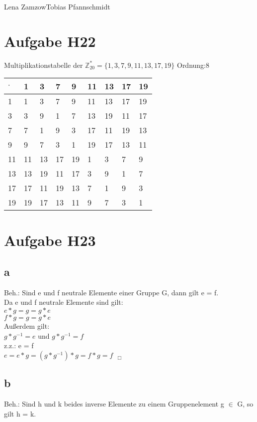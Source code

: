 \documentclass[11pt,a4paper]{article}
\begin{document}
                {Lena Zamzow}{Tobias Pfannschmidt}{}{}{}


\section*{Aufgabe H22}
Multiplikationstabelle der $\mathbb{Z}^{*}_{20} = \{1,3,7,9,11,13,17,19\}$ Ordnung:8\\
\begin{center}
	\begin{tabular}{ | l | l | l | l | l | l | l| l|l}
		\hline
		$\cdot$&1&3&7&9&11&13&17&19 \\ \hline \hline		
		1&1&3&7&9&11&13&17&19 \\ \hline 	
		3&3&9&1&7&13&19&11&17 \\ \hline
		7&7&1&9&3&17&11&19&13\\ \hline	
		9&9&7&3&1&19&17&13&11 \\ \hline
		11&11&13&17&19&1&3&7&9 \\ \hline
		13&13&19&11&17&3&9&1&7 \\ \hline
		17&17&11&19&13&7&1&9&3 \\ \hline
		19&19&17&13&11&9&7&3&1 \\ \hline 
	\end{tabular}
\end{center}
\section*{Aufgabe H23}
\subsection*{a}
Beh.: Sind e und f neutrale Elemente einer Gruppe G, dann gilt e = f. \\

Da e und f neutrale Elemente sind gilt: \\
$e \ast g = g = g \ast e$ \\
$f \ast g = g = g \ast e$ \\
Außerdem gilt: \\
$g \ast g^{-1} = e$ und $g \ast g^{-1} = f$ \\

z.z.: e = f \\
$ e = e \ast g = (g \ast g^{-1}) \ast  g = f \ast  g = f ~~~_\Box$

\subsection*{b}
Beh.: Sind h und k beides inverse Elemente zu einem Gruppenelement g $\in$ G, so gilt h = k. \\
\end{document}
